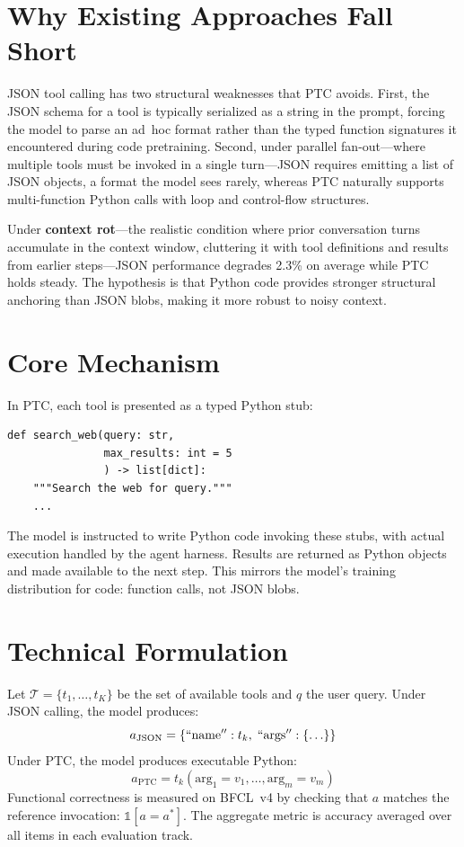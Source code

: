 \documentclass[10pt,twocolumn]{article}
\begin{document}
\section{Why Existing Approaches Fall Short}

JSON tool calling has two structural weaknesses that PTC avoids. First, the JSON
schema for a tool is typically serialized as a string in the prompt, forcing the model
to parse an ad~hoc format rather than the typed function signatures it encountered
during code pretraining. Second, under parallel fan-out---where multiple tools must
be invoked in a single turn---JSON requires emitting a list of JSON objects, a format
the model sees rarely, whereas PTC naturally supports multi-function Python calls with
loop and control-flow structures.

Under \textbf{context rot}---the realistic condition where prior conversation turns
accumulate in the context window, cluttering it with tool definitions and results from
earlier steps---JSON performance degrades 2.3\% on average while PTC holds steady.
The hypothesis is that Python code provides stronger structural anchoring than JSON
blobs, making it more robust to noisy context.

\section{Core Mechanism}

In PTC, each tool is presented as a typed Python stub:

\begin{verbatim}
def search_web(query: str,
               max_results: int = 5
               ) -> list[dict]:
    """Search the web for query."""
    ...
\end{verbatim}

The model is instructed to write Python code invoking these stubs, with actual
execution handled by the agent harness. Results are returned as Python objects and
made available to the next step. This mirrors the model's training distribution for
code: function calls, not JSON blobs.

\section{Technical Formulation}

Let $\mathcal{T} = \{t_1, \ldots, t_K\}$ be the set of available tools and
$q$ the user query. Under JSON calling, the model produces:
\[
a_{\mathrm{JSON}} = \{``\text{name}'': t_k,\; ``\text{args}'': \{\ldots\}\}
\]
Under PTC, the model produces executable Python:
\[
a_{\mathrm{PTC}} = t_k(\text{arg}_1=v_1, \ldots, \text{arg}_m=v_m)
\]
Functional correctness is measured on BFCL~v4 by checking that $a$ matches the
reference invocation: $\mathbb{1}[a = a^*]$. The aggregate metric is accuracy
averaged over all items in each evaluation track.
\end{document}
